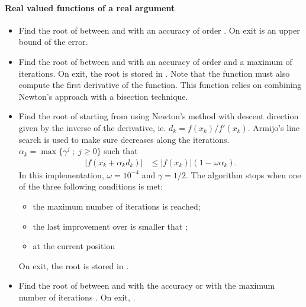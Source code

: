 \paragraph{Real valued functions of a real argument}
\begin{itemize}
\item {}
  \sshortdescribe Find the root of  between  and  with
  an accuracy of order . On exit  is an upper bound of the
  error.

\item {}
  \sshortdescribe Find the root of  between  and  with
  an accuracy of order  and a maximum of  iterations. On
  exit, the root is stored in . Note that the function  must
  also compute the first derivative of the function. This function relies on
  combining Newton's approach with a bisection technique.


\item {}
  \sshortdescribe Find the root of  starting from  using Newton's
  method with descent direction given by the inverse of the derivative, ie.
  $d_k = f(x_k) / f'(x_k)$. Armijo's line search is used to make sure 
  decreases along the iterations. $\alpha_k = \max\{ \gamma^j \; ; \; j \ge 0\}$
  such that
  \begin{align*}
    |f(x_k + \alpha_k d_k)| & \le |f(x_k)| (1 - \omega \alpha_k).
  \end{align*}
  In this implementation, $\omega = 10^{-4}$ and $\gamma = 1/2$.
  The algorithm stops when one of the three following
  conditions is met:
  \begin{itemize}
    \item the maximum number of iterations  is reached;
    \item the last improvement over  is smaller that ;
    \item at the current position 
  \end{itemize}
  On exit, the root is stored in . 
\item {}
  \sshortdescribe Find the root of  between  and  with
  the accuracy  or with the maximum number
  of iterations . On exit, .
\end{itemize}

